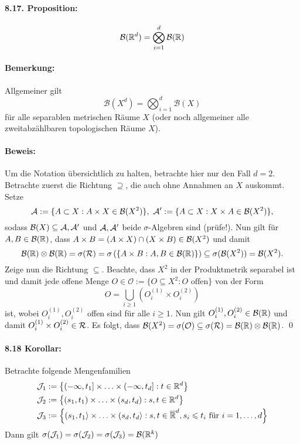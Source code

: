 \paragraph{8.17. Proposition:}
$$\mathcal{B}(\mathbb{R}^d)=\bigotimes_{i=1}^d\mathcal{B}(\mathbb{R})$$

\paragraph{Bemerkung:}Allgemeiner gilt 
$$\mathcal{B}(X^d)=\bigotimes_{i=1}^d\mathcal{B}(X)$$
f\"ur alle separablen metrischen R\"aume $X$ (oder noch allgemeiner alle zweitabz\"ahlbaren topologischen R\"aume $X$).

\paragraph{Beweis:}Um die Notation \"ubersichtlich zu halten, betrachte hier nur den Fall $d=2$. Betrachte zuerst die Richtung $\supseteq$, die auch ohne Annahmen an $X$ auskommt. Setze
$$\mathcal{A}:=\{A\subset X:A\times X\in\mathcal{B}(X^2)\},\ \mathcal{A}':=\{A\subset X:X\times A\in\mathcal{B}(X^2)\},$$
sodass $\mathcal{B}(X)\subseteq\mathcal{A},\mathcal{A}'$ und $\mathcal{A},\mathcal{A}'$ beide $\sigma$-Algebren sind (pr\"ufe!). Nun gilt f\"ur $A,B\in\mathcal{B}(\mathbb{R})$, dass $A\times B=(A\times X)\cap(X\times B)\in\mathcal{B}(X^2)$ und damit 
$$\mathcal{B}(\mathbb{R})\otimes\mathcal{B}(\mathbb{R})=\sigma(\mathcal{R})=\sigma\left(\{A\times B:A,B\in\mathcal{B}(\mathbb{R})\}\right)\subseteq\sigma(\mathcal{B}(X^2))=\mathcal{B}(X^2).$$
Zeige nun die Richtung $\subseteq$. Beachte, dass $X^2$ in der Produktmetrik separabel ist und damit jede offene Menge $O\in\mathcal{O}:=\{O\subseteq X^2:O\text{ offen}\}$ von der Form
 $$O=\bigcup_{i\geq1}(O_i^{(1)}\times O_i^{(2)})$$ 
 ist, wobei $O_i^{(1)}, O_i^{(2)}$ offen sind f\"ur alle $i\geq1$. Nun gilt $O_i^{(1)}, O_i^{(2)}\in\mathcal{B}(\mathbb{R})$ und damit $O_i^{(1)}\times O_i^{(2)}\in\mathcal{R}$. Es folgt, dass
$\mathcal{B}(X^2)=\sigma(\mathcal{O})\subseteq\sigma(\mathcal{R})=\mathcal{B}(\mathbb{R})\otimes\mathcal{B}(\mathbb{R})$. \qed

\paragraph{8.18 Korollar:}Betrachte folgende Mengenfamilien
\begin{align*}
    &\mathcal{J}_1:=\left\{(-\infty,t_1]\times\hdots\times(-\infty,t_d]:t\in\mathbb{R}^d\right\} \\
    &\mathcal{J}_2:=\left\{(s_1,t_1)\times\hdots\times(s_d,t_d):s,t\in\mathbb{R}^d\right\} \\
    &\mathcal{J}_3:=\left\{(s_1,t_1\rangle\times\hdots\times(s_d,t_d\rangle:s,t\in\overline{\mathbb{R}}^d,s_i\leqslant t_i\text{ f\"ur }i=1,\hdots,d\right\} \\
\end{align*}
Dann gilt $\sigma(\mathcal{J}_1)=\sigma(\mathcal{J}_2)=\sigma(\mathcal{J}_3)=\mathcal{B}(\mathbb{R}^k)$

